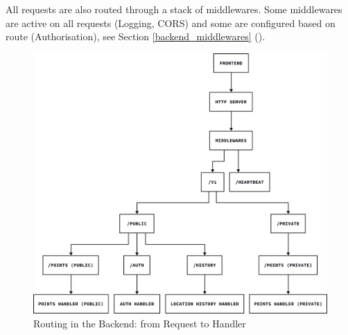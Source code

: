 All requests are also routed through a stack of middlewares. Some middlewares
are active on all requests (Logging, CORS) and some are configured based on
route (Authorisation), see Section \ref{backend_middlewares}
().

\begin{figure}[htbp]
  \centering{}
  \includegraphics[width=\textwidth]{../d2-diagrams/backend-routing/backend-routing.png}
  \caption{Routing in the Backend: from Request to Handler}
  \label{fig:backend_routing}
\end{figure}

